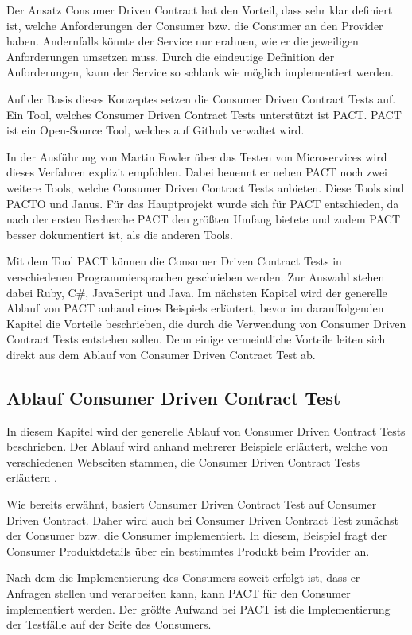 \documentclass{llncs}
\begin{document}
Der Ansatz Consumer Driven Contract hat den Vorteil, dass sehr klar definiert ist, welche Anforderungen der Consumer bzw. die Consumer an den Provider haben. Andernfalls könnte der Service nur erahnen, wie er die jeweiligen Anforderungen umsetzen muss. Durch die eindeutige Definition der Anforderungen, kann der Service so schlank wie möglich implementiert werden.   

Auf der Basis dieses Konzeptes setzen die Consumer Driven Contract Tests auf. Ein Tool, welches Consumer Driven Contract Tests unterstützt ist PACT. PACT ist ein Open-Source Tool, welches auf Github verwaltet wird.

In der Ausführung von Martin Fowler über das Testen von Microservices wird dieses Verfahren explizit empfohlen. Dabei benennt er neben PACT noch zwei weitere Tools, welche Consumer Driven Contract Tests anbieten. Diese Tools sind PACTO und Janus. Für das Hauptprojekt wurde sich für PACT entschieden, da nach der ersten Recherche PACT den größten Umfang bietete und zudem PACT besser dokumentiert ist, als die anderen Tools.

Mit dem Tool PACT können die Consumer Driven Contract Tests in verschiedenen Programmiersprachen geschrieben werden. Zur Auswahl stehen dabei Ruby, C\#, JavaScript und Java. Im nächsten Kapitel wird der generelle Ablauf von PACT anhand eines Beispiels erläutert, bevor im darauffolgenden Kapitel die Vorteile beschrieben, die durch die Verwendung von Consumer Driven Contract Tests entstehen sollen. Denn einige vermeintliche Vorteile leiten sich direkt aus dem Ablauf von Consumer Driven Contract Test ab.

\subsection{Ablauf Consumer Driven Contract Test}
In diesem Kapitel wird der generelle Ablauf von Consumer Driven Contract Tests beschrieben. Der Ablauf wird anhand mehrerer Beispiele erläutert, welche von verschiedenen Webseiten stammen, die Consumer Driven Contract Tests erläutern \cite{bayer2015jaxcenter, vitz2016inno, Vincent2015}.

Wie bereits erwähnt, basiert Consumer Driven Contract Test auf Consumer Driven Contract. Daher wird auch bei Consumer Driven Contract Test zunächst der Consumer bzw. die Consumer implementiert. In diesem, Beispiel fragt der Consumer Produktdetails über ein bestimmtes Produkt beim Provider an.

Nach dem die Implementierung des Consumers soweit erfolgt ist, dass er Anfragen stellen und verarbeiten kann, kann PACT für den Consumer implementiert werden. Der größte Aufwand bei PACT ist die Implementierung der Testfälle auf der Seite des Consumers.
\end{document}
